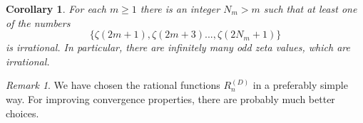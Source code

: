 \documentclass[11pt]{amsart}
\theoremstyle{plain}
\newtheorem{cor}[thm]{Corollary}
\theoremstyle{remark}
\newtheorem{rem}[thm]{Remark}
\theoremstyle{definition}
\begin{document}
\begin{cor}
	For each $m\geq 1$ there is an integer $N_m>m$ such that at least one of the numbers
	\[
		\{\zeta(2m+1),\zeta(2m+3)...,\zeta(2N_m+1)\}
	\]
	is irrational. In particular, there are infinitely many odd zeta values, which are irrational.
\end{cor}

\begin{rem}
We have chosen the rational functions $R_n^{(D)}$ in a preferably simple way. For improving convergence properties, there are probably much better choices.
\end{rem}



 
%

\end{document}
